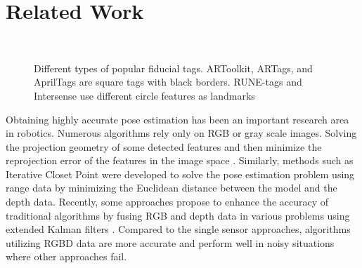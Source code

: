 \section{Related Work}
\label{sec:related}
\begin{figure}
\centering
{} \quad
{} \quad 
{} \\
 \quad
{}
\caption{Different types of popular fiducial tags. ARToolkit, ARTags, and AprilTags are square tags with black borders. RUNE-tags and Intersense use different circle features as landmarks}
\label{fig:tags}
\end{figure}
	Obtaining highly accurate pose estimation has been an important research area in robotics. Numerous algorithms rely only on RGB or gray scale images. Solving the projection geometry of some detected features and then minimize the reprojection error of the features in the image space \citep{grest2009comparison}.  Similarly, methods such as Iterative Closet Point \citep{besl1992method} were developed to solve the pose estimation problem using range data by minimizing the Euclidean distance between the model and the depth data. Recently, some approaches propose to enhance the accuracy of traditional algorithms by fusing RGB and depth data in various problems using extended Kalman filters \citep{gedik2015rgbd, assa2014robust}. Compared to the single sensor approaches, algorithms utilizing RGBD data are more accurate and perform well in noisy situations where other approaches fail. 
	
